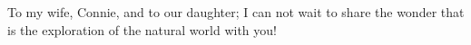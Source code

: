 To my wife, Connie, and to our daughter; I can not wait to share the wonder
that is the exploration of the natural world with you!
